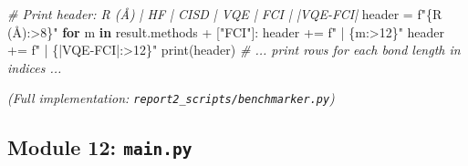 \documentclass[
  11pt,
]{report}
\newenvironment{Shaded}{}{}
\newcommand{\BuiltInTok}[1]{\textcolor[rgb]{0.00,0.50,0.00}{#1}}
\newcommand{\CommentTok}[1]{\textcolor[rgb]{0.38,0.63,0.69}{\textit{#1}}}
\newcommand{\ControlFlowTok}[1]{\textcolor[rgb]{0.00,0.44,0.13}{\textbf{#1}}}
\newcommand{\KeywordTok}[1]{\textcolor[rgb]{0.00,0.44,0.13}{\textbf{#1}}}
\newcommand{\NormalTok}[1]{#1}
\newcommand{\OperatorTok}[1]{\textcolor[rgb]{0.40,0.40,0.40}{#1}}
\newcommand{\SpecialCharTok}[1]{\textcolor[rgb]{0.25,0.44,0.63}{#1}}
\newcommand{\SpecialStringTok}[1]{\textcolor[rgb]{0.73,0.40,0.53}{#1}}
\newcommand{\StringTok}[1]{\textcolor[rgb]{0.25,0.44,0.63}{#1}}
\begin{document}
\begin{Shaded}
\begin{Highlighting}[]
    \CommentTok{\# Print header: R (Å) | HF | CISD | VQE | FCI | |VQE{-}FCI|}
\NormalTok{    header }\OperatorTok{=} \SpecialStringTok{f"}\SpecialCharTok{\{}\StringTok{\textquotesingle{}R (Å)\textquotesingle{}}\SpecialCharTok{:\textgreater{}8\}}\SpecialStringTok{"}
    \ControlFlowTok{for}\NormalTok{ m }\KeywordTok{in}\NormalTok{ result.methods }\OperatorTok{+}\NormalTok{ [}\StringTok{"FCI"}\NormalTok{]:}
\NormalTok{        header }\OperatorTok{+=} \SpecialStringTok{f" | }\SpecialCharTok{\{}\NormalTok{m}\SpecialCharTok{:\textgreater{}12\}}\SpecialStringTok{"}
\NormalTok{    header }\OperatorTok{+=} \SpecialStringTok{f" | }\SpecialCharTok{\{}\StringTok{\textquotesingle{}|VQE{-}FCI|\textquotesingle{}}\SpecialCharTok{:\textgreater{}12\}}\SpecialStringTok{"}
    \BuiltInTok{print}\NormalTok{(header)}
    \CommentTok{\# ... print rows for each bond length in indices ...}
\end{Highlighting}
\end{Shaded}

\emph{(Full implementation: \texttt{report2\_scripts/benchmarker.py})}

\subsection{\texorpdfstring{Module 12:
\texttt{main.py}}{Module 12: main.py}}\label{module-12-main.py}
\end{document}
